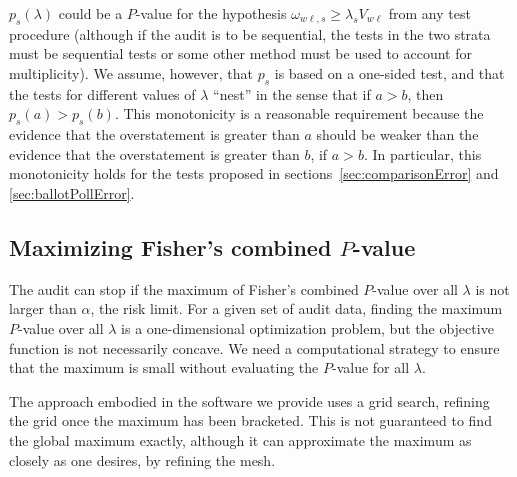 \documentclass[runningheads]{llncs}
\begin{document}
$p_s(\lambda)$ could be a $P$-value for the hypothesis
$\omega_{w\ell,s} \ge \lambda_s V_{w\ell}$ from any test procedure (although
if the audit is to be sequential, the tests in the two strata must be sequential tests or
some other method must be used to account for multiplicity). 
We assume, however, that $p_s$ is based on a one-sided test, and that the tests
for different values of $\lambda$ ``nest'' in the sense that if $a > b$,
then $p_s(a) > p_s(b)$.
This monotonicity is a reasonable requirement because the evidence that the overstatement
is greater than $a$ should be weaker than the evidence that the overstatement is greater than
$b$, if $a > b$.
In particular, this monotonicity holds for the tests proposed in sections~\ref{sec:comparisonError}
and \ref{sec:ballotPollError}.


\subsection{Maximizing Fisher's combined $P$-value}
The audit can stop if the maximum of Fisher's combined $P$-value over all
$\lambda$ is not larger than $\alpha$, the risk limit.
For a given set of audit data, 
finding the maximum $P$-value over all $\lambda$
is a one-dimensional optimization problem, but the objective function is not necessarily concave.
We need a computational strategy to ensure that the maximum is small
without evaluating the $P$-value for all $\lambda$.

The approach embodied in the software we provide uses a grid search, refining the
grid once the maximum has been bracketed.
This is not guaranteed to find the global maximum exactly, although it can approximate 
the maximum as closely as one desires, by refining the mesh.
\end{document}
